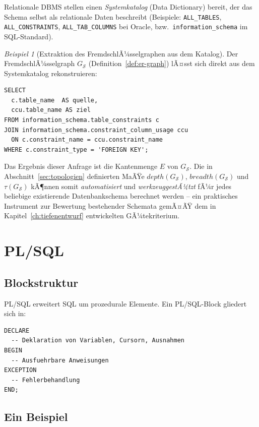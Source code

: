 ﻿\documentclass[a4paper,12pt]{report}
\theoremstyle{definition}
\theoremstyle{remark}
\newtheorem{example}{Beispiel}[chapter]
\newcommand{\depth}{\mathit{depth}}
\newcommand{\breadth}{\mathit{breadth}}
\begin{document}
Relationale DBMS stellen einen \emph{Systemkatalog} (Data Dictionary)
bereit, der das Schema selbst als relationale Daten beschreibt
(Beispiele: \texttt{ALL\_TABLES}, \texttt{ALL\_CONSTRAINTS},
\texttt{ALL\_TAB\_COLUMNS} bei Oracle, bzw.\
\texttt{information\_schema} im SQL-Standard).

\begin{example}[Extraktion des FremdschlÃ¼sselgraphen aus dem Katalog]
\label{ex:katalog-graph}
Der FremdschlÃ¼sselgraph $G_{\mathcal{S}}$ (Definition~\ref{def:er-graph})
lÃ¤sst sich direkt aus dem Systemkatalog rekonstruieren:
\begin{lstlisting}
SELECT
  c.table_name  AS quelle,
  ccu.table_name AS ziel
FROM information_schema.table_constraints c
JOIN information_schema.constraint_column_usage ccu
  ON c.constraint_name = ccu.constraint_name
WHERE c.constraint_type = 'FOREIGN KEY';
\end{lstlisting}
Das Ergebnis dieser Anfrage ist die Kantenmenge $E$ von
$G_{\mathcal{S}}$. Die in Abschnitt~\ref{sec:topologien}
definierten MaÃŸe $\depth(G_{\mathcal{S}})$, $\breadth(G_{\mathcal{S}})$
und $\tau(G_{\mathcal{S}})$ kÃ¶nnen somit \emph{automatisiert} und
\emph{werkzeuggestÃ¼tzt} fÃ¼r jedes beliebige existierende
Datenbankschema berechnet werden -- ein praktisches Instrument zur
Bewertung bestehender Schemata gemÃ¤ÃŸ dem in
Kapitel~\ref{ch:tiefenentwurf} entwickelten GÃ¼tekriterium.
\end{example}

\chapter{PL/SQL}
\label{ch:plsql}

\section{Blockstruktur}

PL/SQL erweitert SQL um prozedurale Elemente. Ein PL/SQL-Block gliedert
sich in:

\begin{lstlisting}
DECLARE
  -- Deklaration von Variablen, Cursorn, Ausnahmen
BEGIN
  -- Ausfuehrbare Anweisungen
EXCEPTION
  -- Fehlerbehandlung
END;
\end{lstlisting}

\section{Ein Beispiel}
\end{document}
